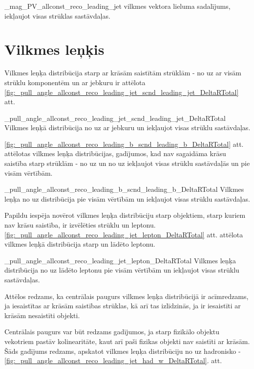           {_mag_PV_allconst_reco_leading_jet}
          {\leadingjet vilkmes vektora lieluma sadalījums, iekļaujot visas strūklas sastāvdaļas.}

\section{Vilkmes leņķis}

Vilkmes leņķa distribūcija starp ar krāsām saistītām strūklām - no \leadingjet uz \scndleadingjet ar visām strūklu komponentēm un ar jebkuru \DeltaR ir attēlota \ref{fig:_pull_angle_allconst_reco_leading_jet_scnd_leading_jet_DeltaRTotal} att.

          {_pull_angle_allconst_reco_leading_jet_scnd_leading_jet_DeltaRTotal}
          {Vilkmes leņķā distribūcija no \leadingjet uz \scndleadingjet ar jebkuru \DeltaR un iekļaujot visas strūklu sastāvdaļas.}


\ref{fig:_pull_angle_allconst_reco_leading_b_scnd_leading_b_DeltaRTotal} att. attēlotas vilkmes leņķa distribūcijas, gadījumos, kad nav sagaidāma krāsu saistība starp strūklām - no \leadingb uz \scndleadingb un no \scndleadingb uz \leadingb iekļaujot visas strūklu sastāvdaļās un pie visām \DeltaR vērtībām.

          {_pull_angle_allconst_reco_leading_b_scnd_leading_b_DeltaRTotal}
          {Vilkmes leņķa no \leadingb uz \scndleadingb distribūcija pie visām \DeltaR vērtībām un iekļaujot visas strūklu sastāvdaļas.}

Papildu iespēja novērot vilkmes leņķa distribūciju starp objektiem, starp kuriem nav krāsu saistība, ir izvēlēties strūklu un leptonu. \ref{fig:_pull_angle_allconst_reco_leading_jet_lepton_DeltaRTotal} att. attēlota vilkmes leņķā distribūcija starp \leadingjet un lādēto leptonu. 

          {_pull_angle_allconst_reco_leading_jet_lepton_DeltaRTotal}
          {Vilkmes leņķa distribūcija no \leadingjet uz lādēto leptonu pie visām \DeltaR vērtībām un iekļaujot visas strūklu sastāvdaļas.}

Attēlos redzams, ka centrālais paugurs vilkmes leņķa distribūcijā ir acīmredzams, ja iesaistītas ar krāsām saistības strūklas, kā arī tas izlīdzinās, ja ir iesaistīti ar krāsām nesaistīti objekti. 

Centrālais paugurs var būt redzams gadījumos, ja starp fizikālo objektu vekotriem pastāv kolinearitāte, kaut arī paši fizikas objekti nav saistīti ar krāsām. Šāds gadījums redzams, apskatot vilkmes leņķa distribūciju no \leadingjet uz hadronisko \PW - \ref{fig:_pull_angle_allconst_reco_leading_jet_had_w_DeltaRTotal}. att. 

